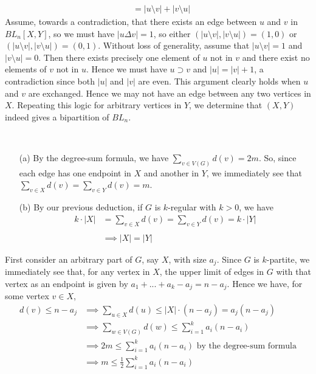 \begin{ans}
\begin{itemize}
\begin{align*}
							  &= |u \setminus v| + |v \setminus u|
	\end{align*}
	Assume, towards a contradiction, that there exists an edge between $u$ and $v$ in $BL_n[X,Y]$, so we must have $|u \Delta v| = 1$, so either $(|u \setminus v|,|v \setminus u|) = (1,0)$ or $(|u \setminus v|,|v \setminus u|) = (0,1)$. Without loss of generality, assume that $|u \setminus v| = 1$ and $|v \setminus u| = 0$. Then there exists precisely one element of $u$ not in $v$ and there exist no elements of $v$ not in $u$. Hence we must have $u \supset v$ and $|u| = |v|+1$, a contradiction since both $|u|$ and $|v|$ are even. This argument clearly holds when $u$ and $v$ are exchanged. Hence we may not have an edge between any two vertices in $X$. Repeating this logic for arbitrary vertices in $Y$, we determine that $(X,Y)$ indeed gives a bipartition of $BL_n$.
\end{itemize}
\end{ans}

\begin{ans} \
\begin{itemize}
	\item[(a)] By the degree-sum formula, we have $\sum_{v \in V(G)} {d(v)} = 2m$. So, since each edge has one endpoint in $X$ and another in $Y$, we immediately see that $\sum_{v \in X} {d(v)} = \sum_{v \in Y} {d(v)} = m$.
	\item[(b)] By our previous deduction, if $G$ is $k$-regular with $k>0$, we have
	\begin{align*}
		k \cdot |X| &= \sum_{v \in X} {d(v)} 
					= \sum_{v \in Y} {d(v)} 
					= k \cdot |Y| \\
		\\
		&\implies |X| = |Y|
	\end{align*}
\end{itemize}
\end{ans}

\begin{ans}
First consider an arbitrary part of $G$, say $X$, with size $a_j$. Since $G$ is $k$-partite, we immediately see that, for any vertex in $X$, the upper limit of edges in $G$ with that vertex as an endpoint is given by $a_1+...+a_k-a_j=n-a_j$. Hence we have, for some vertex $v \in X$,
\begin{align*}
	d(v) \leq n-a_j &\implies \sum_{u \in X} d(u) \leq |X| \cdot (n-a_j) = a_j(n-a_j) \\
					&\implies \sum_{w \in V(G)} d(w) \leq \sum_{i=1}^k a_i(n-a_i) \\
					&\implies 2m \leq \sum_{i=1}^k a_i(n-a_i) \text{ by the degree-sum formula} \\
					&\implies m \leq \frac{1}{2}\sum_{i=1}^k a_i(n-a_i)
\end{align*}
\end{ans}
